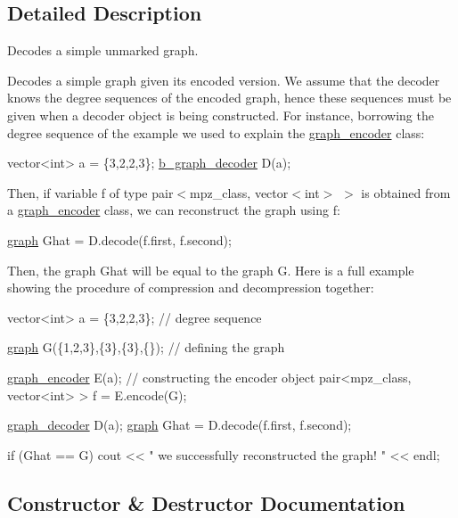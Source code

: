 \subsection{Detailed Description}
Decodes a simple unmarked graph. 

Decodes a simple graph given its encoded version. We assume that the decoder knows the degree sequences of the encoded graph, hence these sequences must be given when a decoder object is being constructed. For instance, borrowing the degree sequence of the example we used to explain the \hyperlink{classgraph__encoder}{graph\+\_\+encoder} class\+:


\begin{DoxyCode}
vector<int> a = \{3,2,2,3\};
\hyperlink{classb__graph__decoder}{b\_graph\_decoder} D(a);
\end{DoxyCode}


Then, if variable f of type {\ttfamily pair$<$mpz\+\_\+class, vector$<$int$>$ $>$} is obtained from a \hyperlink{classgraph__encoder}{graph\+\_\+encoder} class, we can reconstruct the graph using f\+:


\begin{DoxyCode}
\hyperlink{classgraph}{graph} Ghat = D.decode(f.first, f.second);
\end{DoxyCode}


Then, the graph Ghat will be equal to the graph G. Here is a full example showing the procedure of compression and decompression together\+:


\begin{DoxyCode}
vector<int> a = \{3,2,2,3\}; \textcolor{comment}{// degree sequence}

\hyperlink{classgraph}{graph} G(\{1,2,3\},\{3\},\{3\},\{\}); \textcolor{comment}{// defining the graph}

\hyperlink{classgraph__encoder}{graph\_encoder} E(a); \textcolor{comment}{// constructing the encoder object}
pair<mpz\_class, vector<int> > f = E.encode(G);

\hyperlink{classgraph__decoder}{graph\_decoder} D(a);
\hyperlink{classgraph}{graph} Ghat = D.decode(f.first, f.second);

\textcolor{keywordflow}{if} (Ghat == G)
   cout << \textcolor{stringliteral}{" we successfully reconstructed the graph! "} << endl;
\end{DoxyCode}
 

\subsection{Constructor \& Destructor Documentation}
\mbox{\label{classgraph__decoder_a41aa2f322a170376a7904b008e9cdfe0}} 
